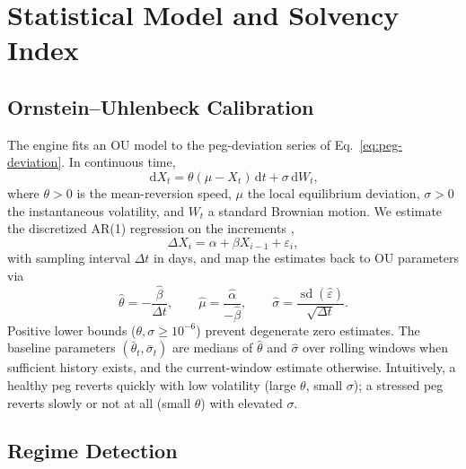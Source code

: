\documentclass[aps,prx,reprint,nofootinbib,longbibliography]{revtex4-2}
\newcommand{\dd}{\,\mathrm{d}}
\begin{document}
\section{Statistical Model and Solvency Index}
\label{sec:model}

\subsection{Ornstein--Uhlenbeck Calibration}

The engine fits an OU model \cite{ou} to the peg-deviation series of
Eq.~\eqref{eq:peg-deviation}. In continuous time,
\begin{equation}
\dd X_t = \theta(\mu-X_t)\dd t+\sigma\dd W_t,
\label{eq:ou}
\end{equation}
where $\theta>0$ is the mean-reversion speed, $\mu$ the local equilibrium
deviation, $\sigma>0$ the instantaneous volatility, and $W_t$ a standard Brownian
motion. We estimate the discretized AR(1) regression on the increments
\cite{hamilton1994,vasicek1977},
\begin{equation}
\Delta X_i = \alpha+\beta X_{i-1}+\varepsilon_i,
\label{eq:ar1}
\end{equation}
with sampling interval $\Delta t$ in days, and map the estimates back to OU
parameters via
\begin{equation}
\hat{\theta}=-\frac{\hat{\beta}}{\Delta t},\qquad
\hat{\mu}=\frac{\hat{\alpha}}{-\hat{\beta}},\qquad
\hat{\sigma}=\frac{\operatorname{sd}(\hat{\varepsilon})}{\sqrt{\Delta t}}.
\label{eq:ou-map}
\end{equation}
Positive lower bounds ($\theta,\sigma\geq 10^{-6}$) prevent degenerate zero
estimates. The baseline parameters $(\bar{\theta}_t,\bar{\sigma}_t)$ are medians of
$\hat\theta$ and $\hat\sigma$ over rolling windows when sufficient history exists,
and the current-window estimate otherwise. Intuitively, a healthy peg reverts
quickly with low volatility (large $\theta$, small $\sigma$); a stressed peg
reverts slowly or not at all (small $\theta$) with elevated $\sigma$.

\subsection{Regime Detection}
\end{document}
